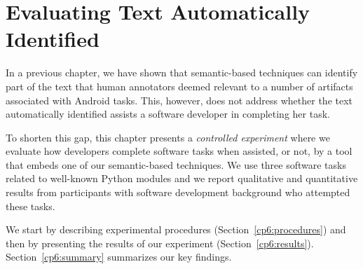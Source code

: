 \setcounter{chapter}{5}
\setcounter{rq}{1}


\chapter{Evaluating Text Automatically Identified}
\label{ch:assisting}



In a previous chapter, we have shown that semantic-based techniques can identify part of the text 
that human annotators deemed relevant to a number of artifacts associated with Android tasks.
This, however, does not address whether the text automatically identified assists a software developer
 in completing her task.



To shorten this gap, this chapter presents a \textit{controlled experiment} 
where we evaluate how developers complete software tasks when assisted, or not, by a tool that 
embeds one of our semantic-based techniques. 
We use three software tasks related to well-known Python modules and
we report qualitative and quantitative results from  participants with software development background who attempted these tasks. 



We start by describing experimental procedures (Section~\ref{cp6:procedures}) and then by presenting the results of our experiment (Section~\ref{cp6:results}). Section~\ref{cp6:summary} summarizes our key findings.






